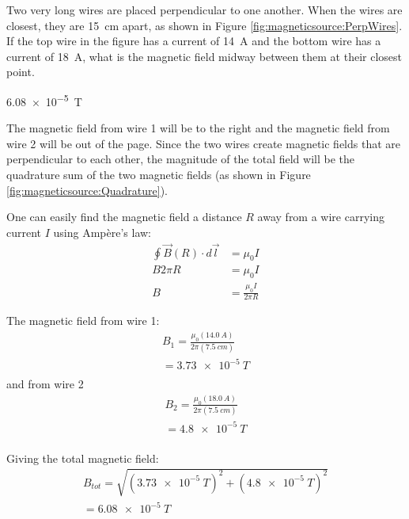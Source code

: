 \question Two very long wires are placed perpendicular to one another. When the wires are closest, they are \SI{15}{cm} apart, as shown in Figure \ref{fig:magneticsource:PerpWires}. If the top wire in the figure has a current of \SI{14}{A} and the bottom wire has a current of \SI{18}{A}, what is the magnetic field midway between them at their closest point.

\begin{finalanswer}
\SI{6.08e-5}{T}
\end{finalanswer}
\begin{solution}
The magnetic field from wire 1 will be to the right and the magnetic field from wire 2 will be out of the page. Since the two wires create magnetic fields that are perpendicular to each other, the magnitude of the total field will be the quadrature sum of the two magnetic fields (as shown in Figure \ref{fig:magneticsource:Quadrature}).

One can easily find the magnetic field a distance $R$ away from a wire carrying current $I$ using Amp\`ere's law:
\begin{align*}
\oint \vec B(R) \cdot d\vec l&=\mu_0I\\
B2\pi R&=\mu_0 I\\
B&=\frac{\mu_0 I}{2\pi R}
\end{align*}

The magnetic field from wire 1:
\begin{align*}
B_1 = \frac{\mu_0 (\SI{14.0}{A})}{2\pi (\SI{7.5}{cm})}\\ 
= \SI{3.73e-5}{T}\\
\end{align*}
and from wire 2
\begin{align*}
B_2 = \frac{\mu_0 (\SI{18.0}{A})}{2\pi (\SI{7.5}{cm})}\\ 
= \SI{4.8e-5}{T}\\
\end{align*}

Giving the total magnetic field:
\begin{align*}
B_{tot} = \sqrt{(\SI{3.73e-5}{T})^2 + (\SI{4.8e-5}{T})^2}\\
= \SI{6.08e-5}{T}
\end{align*}

\end{solution}

